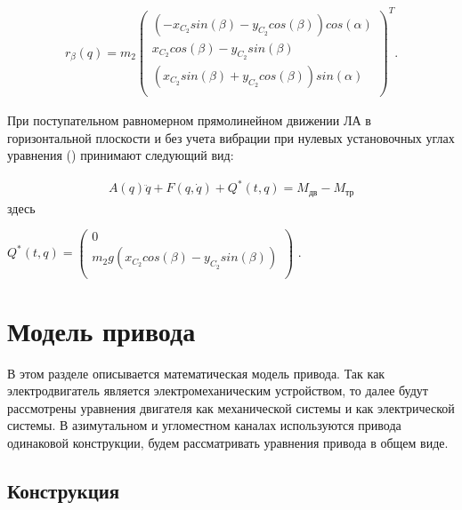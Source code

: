 \begin{equation}
\label{eq:p3:48+5}
\begin{multlined}
r_{ \beta } \left( q \right) =m_{2} \left( \begin{matrix}
\left( -x_{C_{2}}sin \left( \beta \right) -y_{C_{2}}cos \left( \beta \right) \right) cos \left( \alpha \right) \\
x_{C_{2}}cos \left( \beta \right) -y_{C_{2}}sin \left( \beta \right) \\
\left( x_{C_{2}}sin \left( \beta \right) +y_{C_{2}}cos \left( \beta \right) \right) sin \left( \alpha \right) \\
\end{matrix}
\right) ^{T}.
\end{multlined}
\end{equation}

При поступательном равномерном прямолинейном движении ЛА в горизонтальной плоскости и без учета вибрации при нулевых установочных углах уравнения () принимают следующий вид: 


\begin{equation}%
\label{eq:p3:49}
\begin{multlined}
A \left( q \right) \ddot q+F \left( q,\dot q \right) +Q^{\ast} \left( t,q \right) =M_{\textit{дв}}-M_{\textit{тр}}
\end{multlined}
\end{equation}
здесь 

\( Q^{\ast} \left( t,q \right) = \left( \begin{matrix}
0\\
m_{2}g \left( x_{C_{2}}cos \left( \beta \right) -y_{C_{2}}sin \left( \beta \right) \right) \\
\end{matrix}
\right) \) . 

\section{Модель привода} \label{ch:ch3/sect9}

В этом разделе описывается математическая модель привода. Так как электродвигатель является электромеханическим устройством, то далее будут рассмотрены уравнения двигателя как механической системы и как электрической системы. В азимутальном и угломестном каналах используются привода одинаковой конструкции, будем рассматривать уравнения привода в общем виде.

\subsection{Конструкция} \label{sec:ch3/sec9/sub1}


